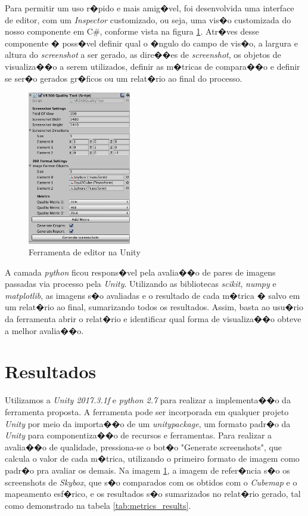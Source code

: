 \documentclass[12pt]{article}
\begin{document}
Para permitir um uso r�pido e mais amig�vel, foi desenvolvida uma interface de editor, com um \textit{Inspector} customizado, ou seja, uma vis�o customizada do nosso componente em C\#, conforme vista na figura \ref{fig:unity_tool}. Atr�ves desse componente � poss�vel definir qual o �ngulo do campo de vis�o, a largura e altura do \textit{screenshot} a ser gerado, as dire��es de \textit{screenshot}, os objetos de visualiza��o a serem utilizados, definir as m�tricas de compara��o e definir se ser�o gerados gr�ficos ou um relat�rio ao final do processo.

\begin{figure}[ht]
\centering
\includegraphics[width=0.4\textwidth]{../images/tool.png}
\caption{Ferramenta de editor na Unity}
\label{fig:unity_tool}
\end{figure}

A camada \textit{python} ficou respons�vel pela avalia��o de pares de imagens passadas via processo pela \textit{Unity}. Utilizando as bibliotecas \textit{scikit}, \textit{numpy} e \textit{matplotlib}, as imagens s�o avaliadas e o resultado de cada m�trica � salvo em um relat�rio ao final, sumarizando todos os resultados. Assim, basta ao usu�rio da ferramenta abrir o relat�rio e identificar qual forma de visualiza��o obteve a melhor avalia��o.

\section{Resultados}  \label{sec:results}

Utilizamos a \textit{Unity 2017.3.1f} e \textit{python 2.7} para realizar a implementa��o da ferramenta proposta. A ferramenta pode ser incorporada em qualquer projeto \textit{Unity} por meio da importa��o de um \textit{unitypackage}, um formato padr�o da \textit{Unity} para componentiza��o de recursos e ferramentas. Para realizar a avalia��o de qualidade, pressiona-se o bot�o "Generate screenshots", que calcula o valor de cada m�trica, utilizando o primeiro formato de imagem como padr�o pra avaliar os demais. Na imagem \ref{fig:unity_tool}, a imagem de refer�ncia s�o os screenshots de \textit{Skybox}, que s�o comparados com os obtidos com o \textit{Cubemap} e o mapeamento esf�rico, e os resultados s�o sumarizados no relat�rio gerado, tal como demonstrado na tabela \ref{tab:metrics_results}.
\end{document}
